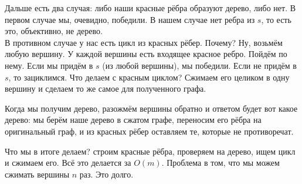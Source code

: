 \documentclass{article}
\begin{document}
    Дальше есть два случая: либо наши красные рёбра образуют дерево, либо нет. В первом случае мы, очевидно, победили. В нашем случае нет ребра из $s$, то есть это, объективно, не дерево.\\
    В противном случае у нас есть цикл из красных рёбер. Почему? Ну, возьмём любую вершину. У каждой вершины есть входящее красное ребро. Пойдём по нему. Если мы придём в $s$ (из любой вершины), мы победили. Если не придём в $s$, то зациклимся. Что делаем с красным циклом? Сжимаем его целиком в одну вершину и сделаем то же самое для полученного графа.
    \begin{figure}[H]
        \qquad
    \end{figure}\noindent
    Когда мы получим дерево, разожмём вершины обратно и ответом будет вот какое дерево: мы берём наше дерево в сжатом графе, переносим его рёбра на оригинальный граф, и из красных рёбер оставляем те, которые не противоречат.
    \begin{figure}[H]
    \end{figure}\noindent
    Что мы в итоге делаем? строим красные рёбра, проверяем на дерево, ищем цикл и сжимаем его. Всё это делается за $O(m)$. Проблема в том, что мы можем сжимать вершины $n$ раз. Это долго.\\
\end{document}
